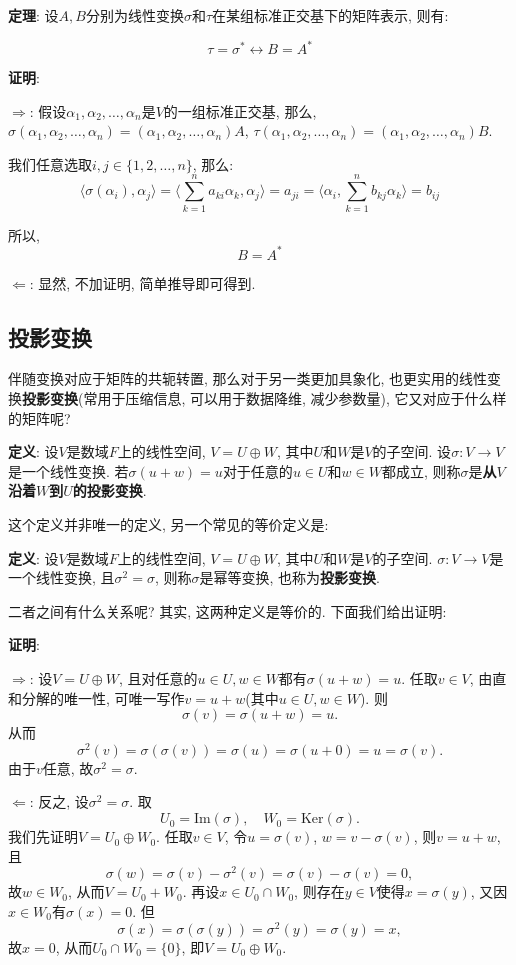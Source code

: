 \documentclass{ctexart}
\begin{document}
\textbf{定理}: 设$A,B$分别为线性变换$\sigma$和$\tau$在某组标准正交基下的矩阵表示, 则有:

$$\tau = \sigma^* \leftrightarrow B = A^*$$

\textbf{证明}:

$\Rightarrow$: 假设$\alpha_1, \alpha_2, \ldots, \alpha_n$是$V$的一组标准正交基, 那么, $\sigma(\alpha_1, \alpha_2, \ldots, \alpha_n) = (\alpha_1, \alpha_2, \ldots, \alpha_n)A$, $\tau(\alpha_1, \alpha_2, \ldots, \alpha_n) = (\alpha_1, \alpha_2, \ldots, \alpha_n)B$.

我们任意选取$i,j \in \{1,2,\ldots,n\}$, 那么:
$$\langle \sigma(\alpha_i), \alpha_j \rangle = \langle \sum_{k=1}^n a_{ki} \alpha_k, \alpha_j \rangle  = a_{ji} = \langle \alpha_i, \sum_{k=1}^n b_{kj} \alpha_k \rangle = b_{ij}$$

所以, $$B = A^*$$

$\Leftarrow$: 显然, 不加证明, 简单推导即可得到.

\subsection{投影变换}

伴随变换对应于矩阵的共轭转置, 那么对于另一类更加具象化, 也更实用的线性变换\textbf{投影变换}(常用于压缩信息, 可以用于数据降维, 减少参数量), 它又对应于什么样的矩阵呢?

\textbf{定义}: 设$V$是数域$F$上的线性空间, $V = U \oplus W$, 其中$U$和$W$是$V$的子空间. 设$\sigma: V \to V$是一个线性变换. 若$\sigma(u + w) = u$对于任意的$u \in U$和$w \in W$都成立, 则称$\sigma$是\textbf{从$V$沿着$W$到$U$的投影变换}.

这个定义并非唯一的定义, 另一个常见的等价定义是:

\textbf{定义}: 设$V$是数域$F$上的线性空间, $V = U \oplus W$, 其中$U$和$W$是$V$的子空间. $\sigma: V \to V$是一个线性变换, 且$\sigma^2 = \sigma$, 则称$\sigma$是幂等变换, 也称为\textbf{投影变换}.

二者之间有什么关系呢? 其实, 这两种定义是等价的. 下面我们给出证明:

\textbf{证明}:

$\Rightarrow$: 设$V = U \oplus W$, 且对任意的$u \in U, w \in W$都有$\sigma(u + w) = u$. 任取$v \in V$, 由直和分解的唯一性, 可唯一写作$v = u + w$(其中$u \in U, w \in W$). 则
$$\sigma(v) = \sigma(u + w) = u.$$
从而
$$\sigma^2(v) = \sigma(\sigma(v)) = \sigma(u) = \sigma(u + 0) = u = \sigma(v).$$
由于$v$任意, 故$\sigma^2 = \sigma$.

$\Leftarrow$: 反之, 设$\sigma^2 = \sigma$. 取
$$U_0 = \text{Im}(\sigma), \quad W_0 = \text{Ker}(\sigma).$$
我们先证明$V = U_0 \oplus W_0$. 任取$v \in V$, 令$u = \sigma(v)$, $w = v - \sigma(v)$, 则$v = u + w$, 且
$$\sigma(w) = \sigma(v) - \sigma^2(v) = \sigma(v) - \sigma(v) = 0,$$
故$w \in W_0$, 从而$V = U_0 + W_0$. 再设$x \in U_0 \cap W_0$, 则存在$y \in V$使得$x = \sigma(y)$, 又因$x \in W_0$有$\sigma(x) = 0$. 但
$$\sigma(x) = \sigma(\sigma(y)) = \sigma^2(y) = \sigma(y) = x,$$
故$x = 0$, 从而$U_0 \cap W_0 = \{0\}$, 即$V = U_0 \oplus W_0$.
\end{document}
